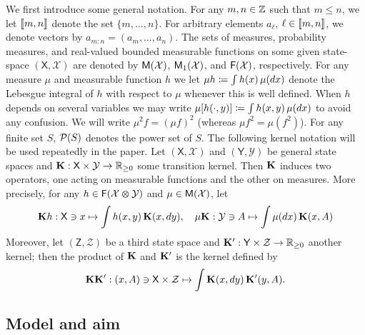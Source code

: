 We first introduce some general notation. 
For any $m, n \in \mathbb{Z}$ such that $m \leq n$, we let $\llbracket m, n \rrbracket$ denote the set $\{m, \ldots, n\}$. For arbitrary elements $a_\ell$, $\ell \in \llbracket m, n \rrbracket$, we denote vectors by $a_{m:n} = (a_m, \ldots, a_n)$. The sets of measures, probability measures, and real-valued bounded measurable functions on some given state-space $(\mathsf{X}, \mathcal{X})$ are denoted by $\mathsf{M}(\mathcal{X})$, $\mathsf{M}_1(\mathcal{X})$, and $\mathsf{F}(\mathcal{X})$, respectively. For any measure $\mu$ and measurable function $h$ we let $\mu h \coloneqq \int h(x) \, \mu(d x)$ denote the Lebesgue integral of $h$ with respect to $\mu$ whenever this is well defined. When $h$ depends on several variables we may write $\mu[h(\cdot,y)]\coloneqq \int h(x,y) \, \mu(d x)$ to avoid any confusion. We will write $\mu^2 f = (\mu f)^2$ (whereas $\mu f^2 = \mu(f^2)$). For any finite set $S$, $\mathcal{P}(S)$ denotes the power set of $S$. The following kernel notation will be used repeatedly in the paper. Let $(\mathsf{X}, \mathcal{X})$ and $(\mathsf{Y}, \mathcal{Y})$ be general state spaces and $\mathbf{K} : \mathsf{X} \times \mathcal{Y} \to \mathbb{R}_{\geq 0}$ some transition kernel. Then $\mathbf{K}$ induces two operators, one acting on measurable functions and the other on measures. More precisely, for any $h \in \mathsf{F}(\mathcal{X} \varotimes \mathcal{Y})$ and $\mu \in \mathsf{M}(\mathcal{X})$, let 
$$
\mathbf{K} h : \mathsf{X} \ni x \mapsto \int h(x, y) \, \mathbf{K}(x, d y), \quad \mu \mathbf{K} : \mathcal{Y} \ni A \mapsto \int \mu(d x) \, \mathbf{K}(x, A)
$$ 
Moreover, let $(\mathsf{Z}, \mathcal{Z})$ be a third state space and $\mathbf{K}' : \mathsf{Y} \times \mathcal{Z} \to \mathbb{R}_{\geq 0}$ another kernel; then the product of $\mathbf{K}$ and $\mathbf{K}'$ is the kernel defined by 
$$
\mathbf{K} \mathbf{K}' : (x, A) \ni \mathsf{X} \times \mathcal{Z} \mapsto \int \mathbf{K}(x, d y) \, \mathbf{K}'(y, A). 
$$    

\subsection{Model and aim}
\label{sec:model}

